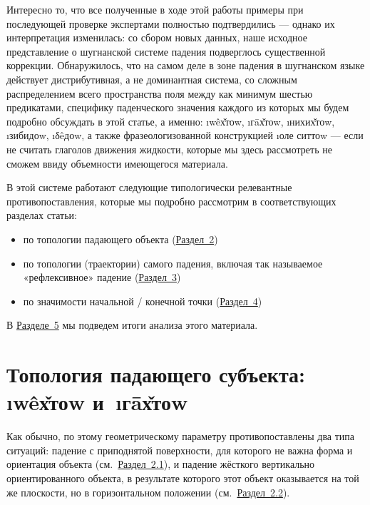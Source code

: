 Интересно то, что все полученные в ходе этой работы примеры при последующей проверке экспертами полностью подтвердились — однако их интерпретация изменилась: со сбором новых данных, наше исходное представление о шугнанской системе падения подверглось существенной коррекции. Обнаружилось, что на самом деле в зоне падения в шугнанском языке действует дистрибутивная, а не доминантная система, со сложным распределением всего пространства поля между как минимум шестью предикатами, специфику паденческого значения каждого из которых мы будем подробно обсуждать в этой статье, а именно: \i{wêх̌тоw}, \i{гāх̌тоw}, \i{нихих̌тоw}, \i{зибидоw}, \i{δêдоw}, а также фразеологизованной конструкцией \i{оле ситтоw} — если не считать глаголов движения жидкости, которые мы здесь рассмотреть не сможем ввиду объемности имеющегося материала.

В этой системе работают следующие типологически релевантные противопоставления, которые мы подробно рассмотрим в соответствующих разделах статьи:

\begin{itemize}
  \item по топологии падающего объекта (\hyperref[down-topology]{Раздел~2})
  \item по топологии (траектории) самого падения, включая так называемое «рефлексивное» падение (\hyperref[down-geometry]{Раздел~3})
  \item по значимости начальной / конечной точки (\hyperref[down-endpoint]{Раздел~4})
\end{itemize}

В \hyperref[down-conclusion]{Разделе~5} мы подведем итоги анализа этого материала.

\section{Топология падающего субъекта: \i{wêх̌тоw} и~\i{гāх̌тоw}} \label{down-topology}

Как обычно, по этому геометрическому параметру противопоставлены два типа ситуаций: падение с приподнятой поверхности, для которого не важна форма и ориентация объекта (см.~\hyperref[down-wextow]{Раздел~2.1}), и падение жёсткого вертикально ориентированного объекта, в результате которого этот объект оказывается на той же плоскости, но в горизонтальном положении (см.~\hyperref[down-vertical]{Раздел~2.2}).

